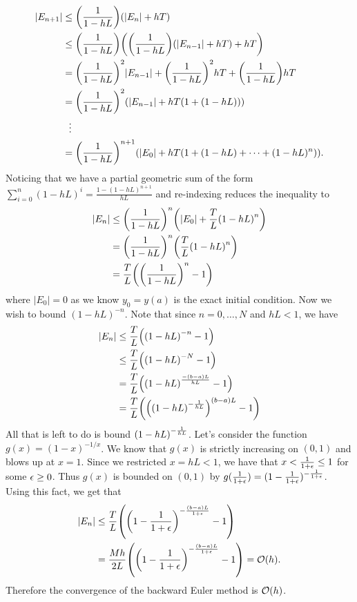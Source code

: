 \documentclass[12pt]{report}
\begin{document}
\begin{solution}
\begin{align*}
        |E_{n+1}| &\leq {\left(\frac{1}{1 - hL}\right)}{\left(|E_n| + hT\right)}\\
        & \leq {\left(\frac{1}{1 - hL}\right)}{\left({\left(\frac{1}{1 - hL}\right)}{\left(|E_{n-1}| + hT\right)} + hT\right)}\\
        &= {\left(\frac{1}{1 - hL}\right)}^2|E_{n-1}| + {\left(\frac{1}{1 - hL}\right)}^2hT + {\left(\frac{1}{1 - hL}\right)}hT\\
        &= {\left(\frac{1}{1 - hL}\right)}^2 {\left(|E_{n-1}| + hT(1 + (1 -hL))\right)}\\
        &~~\vdots\\
        &= {\left(\frac{1}{1 - hL}\right)}^{n+1} {\left(|E_{0}| + hT(1 + (1 -hL) + \dots +(1-hL)^n)\right)}.
    \end{align*}
    Noticing that we have a partial geometric sum of the form $\sum_{i = 0}^n (1 - hL)^i = \frac{1-(1-hL)^{n+1}}{hL}$ and re-indexing reduces the inequality to
    \begin{align*}
        |E_{n}| &\leq  {\left(\frac{1}{1 - hL}\right)}^{n} {\left(|E_{0}| + \frac{T}{L}{\left(1 - hL\right)}^n\right)}\\ 
        &= {\left(\frac{1}{1 - hL}\right)}^{n} {\left(\frac{T}{L}{\left(1 - hL\right)}^n\right)}\\
        &= \frac{T}{L}{\left({\left(\frac{1}{1 - hL}\right)}^{n} - 1\right)}
    \end{align*}
    where $|E_{0}| = 0$ as we know $y_0 = y(a)$ is the exact initial condition. Now we wish to bound $(1 - hL)^{-n}$. Note that since $n = 0, \dots, N$ and $hL < 1$, we have
    \begin{align*}
        |E_{n}| &\leq \frac{T}{L}{\left({\left(1 - hL\right)}^{-n} - 1\right)}\\ 
        &\leq \frac{T}{L}{\left({\left(1 - hL\right)}^{-N} - 1\right)}\\ 
        &= \frac{T}{L}{\left({\left(1 - hL\right)}^{\frac{-(b-a)L}{hL}} - 1\right)}\\ 
        &= \frac{T}{L}{\left({\left( {\left(1-hL\right)}^{-\frac{1}{hL}}\right)}^{(b-a)L} - 1\right)}
    \end{align*} 
    All that is left to do is bound ${\left(1-hL\right)}^{-\frac{1}{hL}}$. Let's consider the function $g(x) = (1 - x)^{-1/x}$. We know that $g(x)$ is strictly increasing on $(0,1)$ and blows up at $x = 1$. Since we restricted $x = hL < 1$, we have that $x < \frac{1}{1+{\epsilon}} \leq 1$ for some ${\epsilon} \geq 0$. Thus $g(x)$ is bounded on $(0,1)$ by $g(\frac{1}{1+{\epsilon}}) = (1 - \frac{1}{1 + {\epsilon}})^{-\frac{1}{1 + {\epsilon}}}$. Using this fact, we get that
    \begin{align*}
        |E_{n}| &\leq \frac{T}{L}{\left({\left(1 - \frac{1}{1 + {\epsilon}}\right)}^{-\frac{(b-a)L}{1 + {\epsilon}}} - 1\right)}\\
        &= \frac{Mh}{2L}{\left({\left(1 - \frac{1}{1 + {\epsilon}}\right)}^{-\frac{(b-a)L}{1 + {\epsilon}}} - 1\right)} = {\mathcal{O}}(h).
    \end{align*}
    Therefore the convergence of the backward Euler method is ${\mathcal{O}}(h)$.
\end{solution}
\end{document}
